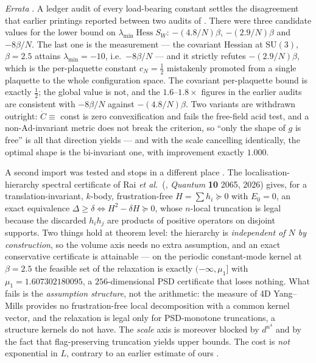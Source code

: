 \emph{Errata} \LE. A ledger audit of every load-bearing constant settles the disagreement that earlier
printings reported between two audits of . There were three candidate values
for the lower bound on $\lambda_{\min}\operatorname{Hess}S_W$: $-(4.8/N)\beta$, $-(2.9/N)\beta$ and
$-8\beta/N$. The last one is the measurement --- the covariant Hessian at $\mathrm{SU}(3)$,
$\beta=2.5$ attains $\lambda_{\min}=-10$, i.e.\ $-8\beta/N$ --- and it strictly refutes
$-(2.9/N)\beta$, which is the per-plaquette constant $c_N=\tfrac12$ mistakenly promoted from a single
plaquette to the whole configuration space. The covariant per-plaquette bound is exactly $\tfrac12$;
the global value is not, and the $1.6$--$1.8\times$ figures in the earlier audits are consistent with
$-8\beta/N$ against $-(4.8/N)\beta$. Two variants are withdrawn outright: $\dot C\equiv$ const is zero
convexification and fails the free-field acid test, and a non-$\mathrm{Ad}$-invariant metric does not
break the criterion, so ``only the shape of $g$ is free'' is all that direction yields --- and with
the scale cancelling identically, the optimal shape is the bi-invariant one, with improvement exactly
$1.000$.

A second import was tested and stops in a different place \LC. The localisation-hierarchy spectral
certificate of Rai \emph{et al.}\ (, \emph{Quantum} \textbf{10} 2065, 2026)
gives, for a translation-invariant, $k$-body, frustration-free $H=\sum h_i\succeq0$ with $E_0=0$, an
exact equivalence $\Delta\ge\delta\iff H^2-\delta H\succeq0$, whose $n$-local truncation is legal
because the discarded $h_ih_j$ are products of positive operators on disjoint supports. Two things
hold at theorem level: the hierarchy is \emph{independent of $N$ by construction}, so the volume
axis needs no extra assumption, and an exact conservative certificate is attainable --- on the
periodic constant-mode kernel at $\beta=2.5$ the feasible set of the relaxation is exactly
$(-\infty,\mu_1]$ with $\mu_1=1.607302180095$, a $256$-dimensional PSD certificate that loses nothing.
What fails is the \emph{assumption structure}, not the arithmetic: the measure of 4D Yang--Mills
provides no frustration-free local decomposition with a common kernel vector, and the relaxation is
legal only for PSD-monotone truncations, a structure kernels do not have. The \emph{scale} axis is
moreover blocked by $d^{n^4}$ and by the fact that flag-preserving truncation yields upper bounds.
The cost is \emph{not} exponential in $L$, contrary to an earlier estimate of ours \LM.

